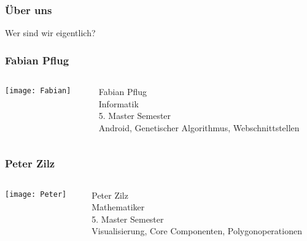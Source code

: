 
\begin{frame}
    \frametitle{Über uns}
    \begin{center}
    \huge{Wer sind wir eigentlich?}
    \end{center}
\end{frame}


\begin{frame}
    \frametitle{Fabian Pflug}
	\begin{columns}
		\begin{column}{0.3\textwidth}
			\texttt{[image: Fabian]}
		\end{column}
		\begin{column}{0.7\textwidth}
			Fabian Pflug\\
			
			Informatik\\
			
			5. Master Semester\\
			
			Android, Genetischer Algorithmus, Webschnittstellen
			
		\end{column}
	\end{columns}
\end{frame}
\begin{frame}
    \frametitle{Peter Zilz}
	\begin{columns}
		\begin{column}{0.3\textwidth}
			\texttt{[image: Peter]}
		\end{column}
		\begin{column}{0.7\textwidth}
			Peter Zilz\\
			
			Mathematiker\\
			
			5. Master Semester\\
			
			Visualisierung, Core Componenten, Polygonoperationen
			
		\end{column}
	\end{columns}
\end{frame}


